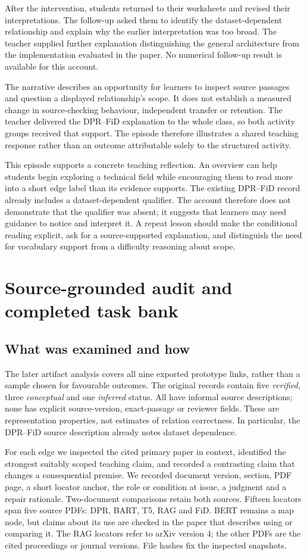 After the intervention, students returned to their worksheets and revised their interpretations. The follow-up asked them to identify the dataset-dependent relationship and explain why the earlier interpretation was too broad. The teacher supplied further explanation distinguishing the general architecture from the implementation evaluated in the paper. No numerical follow-up result is available for this account.

The narrative describes an opportunity for learners to inspect source passages and question a displayed relationship's scope. It does not establish a measured change in source-checking behaviour, independent transfer or retention. The teacher delivered the DPR--FiD explanation to the whole class, so both activity groups received that support. The episode therefore illustrates a shared teaching response rather than an outcome attributable solely to the structured activity.

This episode supports a concrete teaching reflection. An overview can help students begin exploring a technical field while encouraging them to read more into a short edge label than its evidence supports. The existing DPR--FiD record already includes a dataset-dependent qualifier. The account therefore does not demonstrate that the qualifier was absent; it suggests that learners may need guidance to notice and interpret it. A repeat lesson should make the conditional reading explicit, ask for a source-supported explanation, and distinguish the need for vocabulary support from a difficulty reasoning about scope.

\section{Source-grounded audit and completed task bank}
\subsection{What was examined and how}
The later artifact analysis covers all nine exported prototype links, rather than a sample chosen for favourable outcomes. The original records contain five \emph{verified}, three \emph{conceptual} and one \emph{inferred} status. All have informal source descriptions; none has explicit source-version, exact-passage or reviewer fields. These are representation properties, not estimates of relation correctness. In particular, the DPR--FiD source description already notes dataset dependence.

For each edge we inspected the cited primary paper in context, identified the strongest suitably scoped teaching claim, and recorded a contrasting claim that changes a consequential premise. We recorded document version, section, PDF page, a short locator anchor, the role or condition at issue, a judgment and a repair rationale. Two-document comparisons retain both sources. Fifteen locators span five source PDFs: DPR, BART, T5, RAG and FiD. BERT remains a map node, but claims about its use are checked in the paper that describes using or comparing it. The RAG locators refer to arXiv version 4; the other PDFs are the cited proceedings or journal versions. File hashes fix the inspected snapshots.


